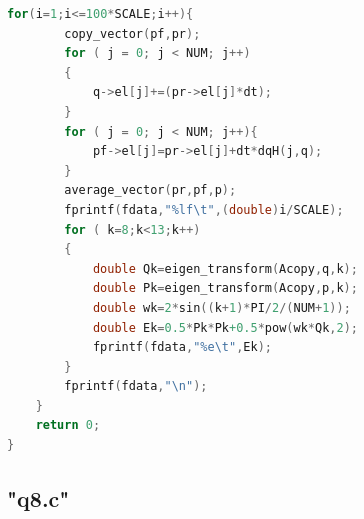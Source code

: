 \documentclass[10pt, a4paper]{article}
\begin{document}
\begin{lstlisting}[language=C]
    for(i=1;i<=100*SCALE;i++){
        copy_vector(pf,pr);
        for ( j = 0; j < NUM; j++)
        {
            q->el[j]+=(pr->el[j]*dt);
        }
        for ( j = 0; j < NUM; j++){
            pf->el[j]=pr->el[j]+dt*dqH(j,q);
        }
        average_vector(pr,pf,p);
        fprintf(fdata,"%lf\t",(double)i/SCALE);
        for ( k=8;k<13;k++)
        {
            double Qk=eigen_transform(Acopy,q,k);
            double Pk=eigen_transform(Acopy,p,k);
            double wk=2*sin((k+1)*PI/2/(NUM+1));
            double Ek=0.5*Pk*Pk+0.5*pow(wk*Qk,2);
            fprintf(fdata,"%e\t",Ek);
        }
        fprintf(fdata,"\n");
    }
    return 0;
}
    \end{lstlisting}

    \subsection{"q8.c"}
\end{document}
